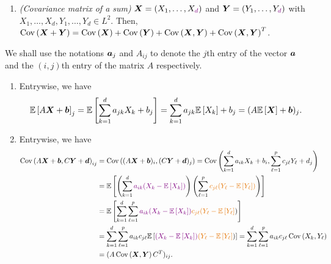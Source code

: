 \begin{enumerate}
\begin{enumerate}
\item\label{it:cov-sums} \emph{(Covariance matrix of a sum)} \(\vect{X}=(X_1,\dotsc,X_{\vc{d}})\)
and \(\vect{Y}=(Y_1,\dotsc,Y_{\vc{d}})\) with
\(X_1,\dotsc,X_d,Y_1,\dotsc,Y_d\in L^{2}\). Then,
\(\operatorname{Cov}\left(\bm{X}+\bm{Y}\right)=\operatorname{Cov}\left(\bm{X}\right)+\operatorname{Cov}\left(\bm{Y}\right)
+\operatorname{Cov}\left(\bm{X},\bm{Y}\right)+\operatorname{Cov}\left(\bm{X},\bm{Y}\right)^{T}\).
\end{enumerate}
\begin{pf}
We shall use the notations \(\bm{a}_j\) and \(A_{ij}\) to denote the \(j\)th
entry of the vector \(\bm{a}\) and the \((i,j)\)th entry of the matrix \(A\)
respectively.
\begin{enumerate}
\item Entrywise, we have
\[
\mathbb{E}\left[A\bm{X}+\bm{b}\right]_{j}=\mathbb{E}\left[\sum_{k=1}^{d}a_{jk}X_k+b_j\right]
=\sum_{k=1}^{d}a_{jk}\mathbb{E}\left[X_k\right]+b_j
=(A\mathbb{E}\left[\bm{X}\right]+\bm{b})_{j}.
\]
\item Entrywise, we have
\begin{align*}
\cov{A\vect{X}+\vect{b},C\vect{Y}+\vect{d}}_{ij}
&=\cov{(A\vect{X}+\vect{b})_{i},(C\vect{Y}+\vect{d})_{j}}
=\cov{\sum_{k=1}^{d}a_{ik}X_k+b_i,\sum_{\ell=1}^{p}c_{j\ell}Y_{\ell}+d_j} \\
&=\expv{\left(\sum_{k=1}^{d}\vc{a_{ik}(X_k-\expv{X_k})}\right)
\left(\sum_{\ell=1}^{p}\orc{c_{j\ell}(Y_{\ell}-\expv{Y_{\ell}})}\right)} \\
&=\expv{\sum_{k=1}^{d}\sum_{\ell=1}^{p}\vc{a_{ik}(X_k-\expv{X_k})}
\orc{c_{j\ell}(Y_{\ell}-\expv{Y_{\ell}}})} \\
&=\sum_{k=1}^{d}\sum_{\ell=1}^{p}a_{ik}c_{j\ell}
\expv{\vc{(X_k-\expv{X_k})}\orc{(Y_{\ell}-\expv{Y_{\ell}}})}
=\sum_{k=1}^{d}\sum_{\ell=1}^{p}a_{ik}c_{j\ell}\cov{X_k,Y_{\ell}} \\
&=(A\cov{\vect{X},\vect{Y}}C^{T})_{ij}.
\end{align*}


\end{enumerate}
\end{pf}
\end{enumerate}
